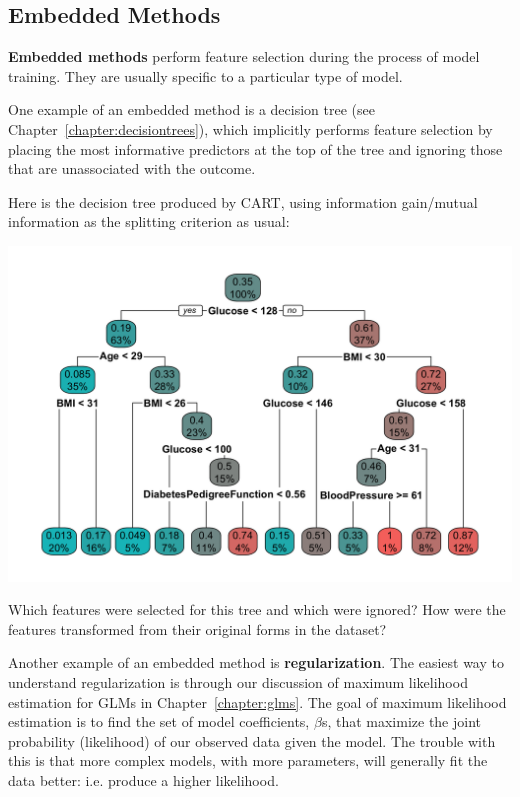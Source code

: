 \newpage

\subsection{Embedded Methods}

\textbf{Embedded methods} perform feature selection during the process of model training. They are usually specific to a particular type of model. 

One example of an embedded method is a decision tree (see Chapter~\ref{chapter:decisiontrees}), which implicitly performs feature selection by placing the most informative predictors at the top of the tree and ignoring those that are unassociated with the outcome. 

\vspace{2mm}

\begin{question}{}
Here is the decision tree produced by CART, using information gain/mutual information as the splitting criterion as usual:
\begin{center}
\includegraphics[width=\textwidth]{img/pima-decision-tree.png}
\end{center}
Which features were selected for this tree and which were ignored? How were the features transformed from their original forms in the dataset?
\end{question}

Another example of an embedded method is \textbf{regularization}. The easiest way to understand regularization is through our discussion of maximum likelihood estimation for GLMs in Chapter~\ref{chapter:glms}. The goal of maximum likelihood estimation is to find the set of model coefficients, $\beta$s, that maximize the joint probability (likelihood) of our observed data given the model. The trouble with this is that more complex models, with more parameters, will generally fit the data better: i.e. produce a higher likelihood.


